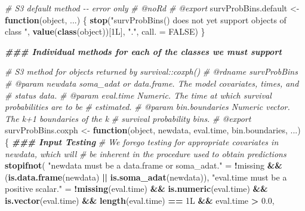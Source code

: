 \documentclass[
]{book}
\newenvironment{Shaded}{\begin{snugshade}}{\end{snugshade}}
\newcommand{\AttributeTok}[1]{\textcolor[rgb]{0.13,0.29,0.53}{#1}}
\newcommand{\CommentTok}[1]{\textcolor[rgb]{0.56,0.35,0.01}{\textit{#1}}}
\newcommand{\ConstantTok}[1]{\textcolor[rgb]{0.56,0.35,0.01}{#1}}
\newcommand{\ControlFlowTok}[1]{\textcolor[rgb]{0.13,0.29,0.53}{\textbf{#1}}}
\newcommand{\DocumentationTok}[1]{\textcolor[rgb]{0.56,0.35,0.01}{\textbf{\textit{#1}}}}
\newcommand{\FloatTok}[1]{\textcolor[rgb]{0.00,0.00,0.81}{#1}}
\newcommand{\FunctionTok}[1]{\textcolor[rgb]{0.13,0.29,0.53}{\textbf{#1}}}
\newcommand{\NormalTok}[1]{#1}
\newcommand{\OtherTok}[1]{\textcolor[rgb]{0.56,0.35,0.01}{#1}}
\newcommand{\SpecialCharTok}[1]{\textcolor[rgb]{0.81,0.36,0.00}{\textbf{#1}}}
\newcommand{\StringTok}[1]{\textcolor[rgb]{0.31,0.60,0.02}{#1}}
\begin{document}
\begin{Shaded}
\begin{Highlighting}[]
\CommentTok{\#\textquotesingle{} S3 default method {-}{-} error only}
\CommentTok{\#\textquotesingle{} @noRd}
\CommentTok{\#\textquotesingle{} @export}
\NormalTok{survProbBins.default }\OtherTok{\textless{}{-}} \ControlFlowTok{function}\NormalTok{(object, ...) \{}
  \FunctionTok{stop}\NormalTok{(}\StringTok{"\textasciigrave{}survProbBins()\textasciigrave{} does not yet support objects of class "}\NormalTok{,}
       \FunctionTok{value}\NormalTok{(}\FunctionTok{class}\NormalTok{(object))[1L], }\StringTok{"."}\NormalTok{, }\AttributeTok{call. =} \ConstantTok{FALSE}\NormalTok{)}
\NormalTok{\}}

\DocumentationTok{\#\#\# Individual methods for each of the classes we must support}

\CommentTok{\#\textquotesingle{} S3 method for objects returned by \textasciigrave{}survival::coxph()\textasciigrave{}}
\CommentTok{\#\textquotesingle{} @rdname survProbBins}
\CommentTok{\#\textquotesingle{} @param newdata soma\_adat or data.frame. The model covariates, times, and}
\CommentTok{\#\textquotesingle{}   status data.}
\CommentTok{\#\textquotesingle{} @param eval.time Numeric. The time at which survival probabilities are to be}
\CommentTok{\#\textquotesingle{}   estimated.}
\CommentTok{\#\textquotesingle{} @param bin.boundaries Numeric vector. The k+1 boundaries of the k}
\CommentTok{\#\textquotesingle{}   survival probability bins.}
\CommentTok{\#\textquotesingle{} @export}
\NormalTok{survProbBins.coxph }\OtherTok{\textless{}{-}} \ControlFlowTok{function}\NormalTok{(object, newdata, eval.time, bin.boundaries, ...) \{}
  \DocumentationTok{\#\#\# Input Testing}
  \CommentTok{\# We forego testing for appropriate covariates in \textasciigrave{}newdata\textasciigrave{}, which will}
  \CommentTok{\#   be inherent in the procedure used to obtain predictions}
  \FunctionTok{stopifnot}\NormalTok{(}
    \StringTok{"\textasciigrave{}newdata\textasciigrave{} must be a data.frame or soma\_adat."} \OtherTok{=} 
      \SpecialCharTok{!}\NormalTok{missing }\SpecialCharTok{\&\&}\NormalTok{ (}\FunctionTok{is.data.frame}\NormalTok{(newdata) }\SpecialCharTok{||} \FunctionTok{is.soma\_adat}\NormalTok{(newdata)),}
    \StringTok{"\textasciigrave{}eval.time\textasciigrave{} must be a positive scalar."} \OtherTok{=} 
      \SpecialCharTok{!}\FunctionTok{missing}\NormalTok{(eval.time) }\SpecialCharTok{\&\&} \FunctionTok{is.numeric}\NormalTok{(eval.time) }\SpecialCharTok{\&\&} 
        \FunctionTok{is.vector}\NormalTok{(eval.time) }\SpecialCharTok{\&\&} \FunctionTok{length}\NormalTok{(eval.time) }\SpecialCharTok{==}\NormalTok{ 1L }\SpecialCharTok{\&\&}\NormalTok{ eval.time }\SpecialCharTok{\textgreater{}} \FloatTok{0.0}\NormalTok{,}

\end{Highlighting}
\end{Shaded}
\end{document}
